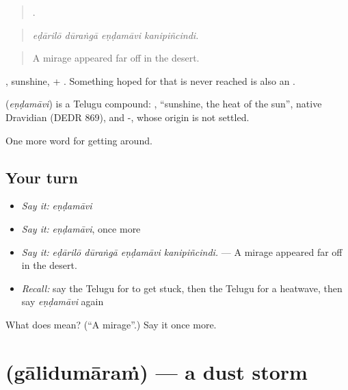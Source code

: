 \begin{quote}
   .
\end{quote}

\begin{quote}
\emph{eḍārilō dūraṅgā eṇḍamāvi kanipiñcindi.}
\end{quote}

\begin{quote}
A mirage appeared far off in the desert.
\end{quote}

, sunshine, + . Something hoped for that is never reached is also an .

\begin{cousinweb}
\textbf{} (\emph{eṇḍamāvi}) is a Telugu compound: , \textquotedblleft{}sunshine, the heat of the sun\textquotedblright{}, native Dravidian (DEDR 869), and -, whose origin is not settled.
\end{cousinweb}

\begin{grammarlens}[title={What you've built}]
One more word for getting around.
\end{grammarlens}

\subsection*{Your turn}
\begin{itemize}
\raggedright
  \item \emph{Say it:} \emph{eṇḍamāvi}
  \item \emph{Say it:} \emph{eṇḍamāvi}, once more
  \item \emph{Say it:} \emph{eḍārilō dūraṅgā eṇḍamāvi kanipiñcindi.} — A mirage appeared far off in the desert.
  \item \emph{Recall:} say the Telugu for to get stuck, then the Telugu for a heatwave, then say \emph{eṇḍamāvi} again
\end{itemize}

\begin{tcolorbox}[breakable,colback=teal!4,colframe=teal!35!black,title={Before you move on}]
What does  mean? (\textquotedblleft{}A mirage\textquotedblright{}.) Say it once more.
\end{tcolorbox}
\section[\texorpdfstring{\te{గాలిదుమారం} (gālidumāraṁ)}{గాలిదుమారం (gālidumāraṁ)}]{ (gālidumāraṁ) — a dust storm}

